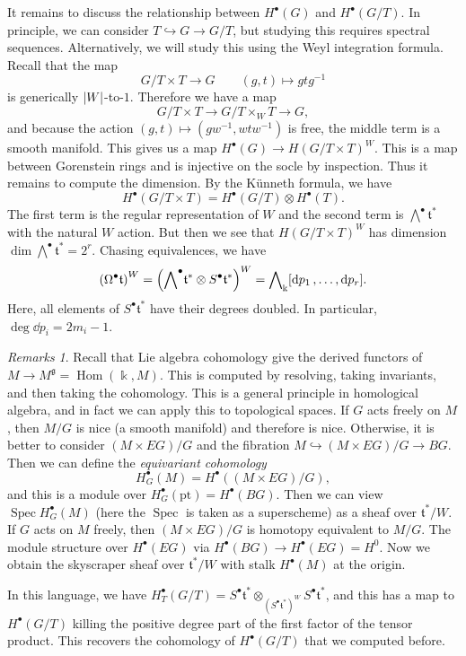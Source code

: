 \documentclass[leqno, openany]{memoir}
\theoremstyle{definition}
\theoremstyle{remark}
\newtheorem{rmks}[thm]{Remarks}
\theoremstyle{plain}
\theoremstyle{definition}
\theoremstyle{remark}
\renewcommand{\k}{\Bbbk}
\newcommand{\mf}[1]{\mathfrak{#1}}
\newcommand{\mr}[1]{\mathrm{#1}}
\DeclareMathOperator{\Hom}{Hom}
\DeclareMathOperator{\Spec}{Spec}
\begin{document}
It remains to discuss the relationship between $H^{\bullet}(G)$ and $H^{\bullet}(G/T)$. In principle, we can consider $T \hookrightarrow G \to G/T$, but studying this requires spectral sequences. Alternatively, we will study this using the Weyl integration formula. Recall that the map 
\[ G/T \times T \to G \qquad (g,t) \mapsto gtg^{-1} \]
is generically $\abs{W}$-to-$1$. Therefore we have a map
\[ G/T \times T \to G/T \times_W T \to G, \]
and because the action $(g,t) \mapsto (gw^{-1}, wtw^{-1})$ is free, the middle term is a smooth manifold. This gives us a map $H^{\bullet}(G) \to {H(G/T \times T)}^W$. This is a map between Gorenstein rings and is injective on the socle by inspection. Thus it remains to compute the dimension. By the K\"unneth formula, we have
\[ H^{\bullet}(G/T \times T) = H^{\bullet}(G/T) \otimes H^{\bullet}(T). \]
The first term is the regular representation of $W$ and the second term is $\bigwedge^{\bullet} \mf{t}^*$ with the natural $W$ action. But then we see that ${ H(G/T \times T) }^W$ has dimension $\dim \bigwedge^{\bullet} \mf{t}^* = 2^r$. Chasing equivalences, we have
\[ {(\Omega^{\bullet} \mf{t})}^W = {\qty({\bigwedge}^{\bullet} \mf{t}^* \otimes S^{\bullet} \mf{t}^*)}^W = {\bigwedge}_{\k} [\dd{p_1}, \ldots, \dd{p_r}]. \]
Here, all elements of $S^{\bullet} \mf{t}^*$ have their degrees doubled. In particular, $\deg \dd{p_i} = 2 m_i - 1$.

\begin{rmks}
    Recall that Lie algebra cohomology give the derived functors of $M \to M^{\mf{g}} = \Hom(\k, M)$. This is computed by resolving, taking invariants, and then taking the cohomology. This is a general principle in homological algebra, and in fact we can apply this to topological spaces. If $G$ acts freely on $M$, then $M/G$ is nice (a smooth manifold) and therefore is nice. Otherwise, it is better to consider $(M \times EG)/G$ and the fibration $M \hookrightarrow (M \times EG)/G \to BG$. Then we can define the \textit{equivariant cohomology}
    \[ H^{\bullet}_G(M) = H^{\bullet}((M \times EG)/G), \]
    and this is a module over $H_G^{\bullet}(\mr{pt}) = H^{\bullet}(BG)$. Then we can view $\Spec H_G^{\bullet}(M)$ (here the $\Spec$ is taken as a superscheme) as a sheaf over $\mf{t}^*/W$. If $G$ acts on $M$ freely, then $(M \times EG)/G$ is homotopy equivalent to $M/G$. The module structure over $H^{\bullet}(EG)$ via $H^{\bullet}(BG) \to H^{\bullet}(EG) = H^0$. Now we obtain the skyscraper sheaf over $\mf{t}^*/W$ with stalk $H^{\bullet}(M)$ at the origin.

    In this language, we have $H_T^{\bullet}(G/T) = S^{\bullet} \mf{t}^* \otimes_{{(S^{\bullet} \mf{t}^*)}^W} S^{\bullet} \mf{t}^*$, and this has a map to $H^{\bullet}(G/T)$ killing the positive degree part of the first factor of the tensor product. This recovers the cohomology of $H^{\bullet}(G/T)$ that we computed before.
\end{rmks}
\end{document}
